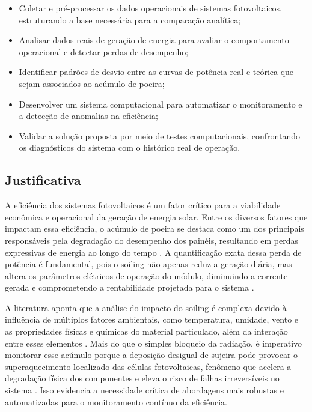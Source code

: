 \documentclass{UNESC}
\begin{document}
\begin{itemize}

\item Coletar e pré-processar os dados operacionais de sistemas fotovoltaicos, estruturando a base necessária para a comparação analítica;

\item Analisar dados reais de geração de energia para avaliar o comportamento operacional e detectar perdas de desempenho;

\item Identificar padrões de desvio entre as curvas de potência real e teórica que sejam associados ao acúmulo de poeira;

\item Desenvolver um sistema computacional para automatizar o monitoramento e a detecção de anomalias na eficiência;

\item Validar a solução proposta por meio de testes computacionais, confrontando os diagnósticos do sistema com o histórico real de operação.

\end{itemize}

\subsection{Justificativa}

A eficiência dos sistemas fotovoltaicos é um fator crítico para a viabilidade econômica e operacional da geração de energia solar. Entre os diversos fatores que impactam essa eficiência, o acúmulo de poeira se destaca como um dos principais responsáveis pela degradação do desempenho dos painéis, resultando em perdas expressivas de energia ao longo do tempo \cite{abuzaid2022, Araujo_Marques}. A quantificação exata dessa perda de potência é fundamental, pois o soiling não apenas reduz a geração diária, mas altera os parâmetros elétricos de operação do módulo, diminuindo a corrente gerada e comprometendo a rentabilidade projetada para o sistema \cite{Araujo_Marques}.

A literatura aponta que a análise do impacto do soiling é complexa devido à influência de múltiplos fatores ambientais, como temperatura, umidade, vento e as propriedades físicas e químicas do material particulado, além da interação entre esses elementos \cite{abuzaid2022, jaszczur2020, john2016}. Mais do que o simples bloqueio da radiação, é imperativo monitorar esse acúmulo porque a deposição desigual de sujeira pode provocar o superaquecimento localizado das células fotovoltaicas, fenômeno que acelera a degradação física dos componentes e eleva o risco de falhas irreversíveis no sistema \cite{jaszczur2020}. Isso evidencia a necessidade crítica de abordagens mais robustas e automatizadas para o monitoramento contínuo da eficiência.
\end{document}
